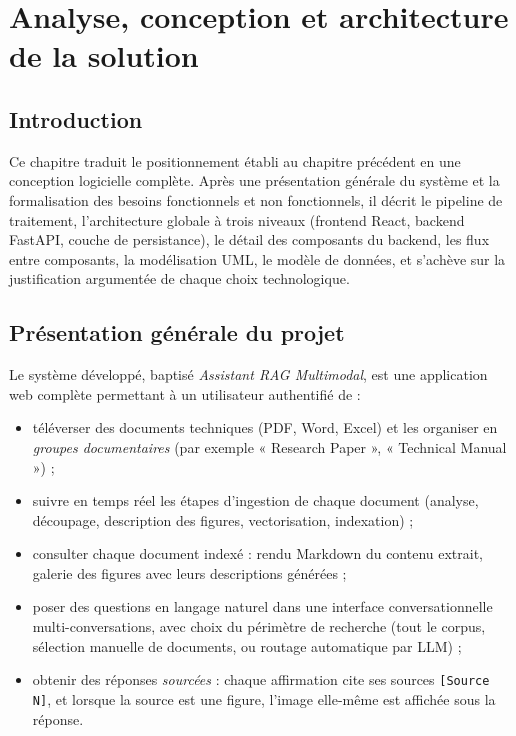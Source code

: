 \chapter{Analyse, conception et architecture de la solution}
\label{chap:conception}

\section{Introduction}

Ce chapitre traduit le positionnement établi au chapitre précédent en une conception
logicielle complète. Après une présentation générale du système et la formalisation des
besoins fonctionnels et non fonctionnels, il décrit le pipeline de traitement, l'architecture
globale à trois niveaux (frontend React, backend FastAPI, couche de persistance), le détail
des composants du backend, les flux entre composants, la modélisation UML, le modèle de
données, et s'achève sur la justification argumentée de chaque choix technologique.

\section{Présentation générale du projet}

Le système développé, baptisé \emph{Assistant RAG Multimodal}, est une application web
complète permettant à un utilisateur authentifié de :

\begin{itemize}
  \item téléverser des documents techniques (PDF, Word, Excel) et les organiser en
        \emph{groupes documentaires} (par exemple « Research Paper », « Technical Manual ») ;
  \item suivre en temps réel les étapes d'ingestion de chaque document (analyse, découpage,
        description des figures, vectorisation, indexation) ;
  \item consulter chaque document indexé : rendu Markdown du contenu extrait, galerie des
        figures avec leurs descriptions générées ;
  \item poser des questions en langage naturel dans une interface conversationnelle
        multi-conversations, avec choix du périmètre de recherche (tout le corpus, sélection
        manuelle de documents, ou routage automatique par LLM) ;
  \item obtenir des réponses \emph{sourcées} : chaque affirmation cite ses sources
        \texttt{[Source N]}, et lorsque la source est une figure, l'image elle-même est
        affichée sous la réponse.
\end{itemize}

